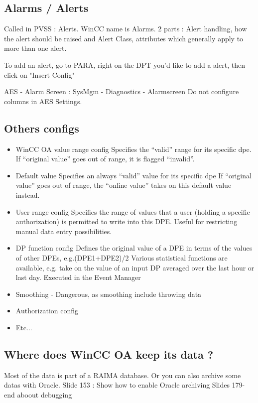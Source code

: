 \documentclass[a4paper, 10pt]{article}
\begin{document}
\subsection{Alarms / Alerts}
Called in PVSS : Alerts. WinCC name is Alarms.
2 parts : Alert handling, how the alert should be raised and Alert Class, attributes which generally apply to more than one alert.

To add an alert, go to PARA, right on the DPT you'd like to add a alert, then click on "Insert Config"

AES - Alarm Screen : SysMgm - Diagnostics - Alarmscreen
Do not configure columns in AES Settings.

\subsection{Others configs}
\begin{itemize}
    \item WinCC OA value range config
Specifies the “valid” range for its specific dpe.
If “original value” goes out of range, it is flagged “invalid”. 
    \item Default value
Specifies an always “valid” value for its specific dpe
If “original value” goes out of range, the “online value” takes on this default value instead.
    \item User range config
Specifies the range of values that a user (holding a specific authorization) is permitted to
write into this DPE. Useful for restricting manual data entry possibilities.
    \item DP function config
Defines the original value of a DPE in terms of the values of other DPEs, e.g.(DPE1+DPE2)/2
Various statistical functions are available, e.g. take on the value of an input DP averaged over the last hour or last day. Executed in the Event Manager
    \item Smoothing - Dangerous, as smoothing include throwing data
    \item Authorization config
    \item Etc...
\end{itemize}

\subsection{Where does WinCC OA keep its data ?}
Most of the data is part of a RAIMA database. Or you can also archive some datas with Oracle.
Slide 153 : Show how to enable Oracle archiving
Slides 179-end aboout debugging
\end{document}
